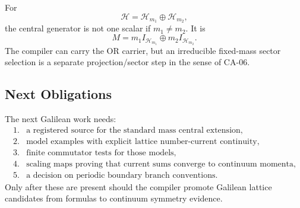 For
\[
  \mathcal H=\mathcal H_{m_1}\oplus\mathcal H_{m_2},
\]
the central generator is not one scalar if \(m_1\ne m_2\).  It is
\[
  M=m_1I_{\mathcal H_{m_1}}\oplus m_2I_{\mathcal H_{m_2}}.
\]
The compiler can carry the OR carrier, but an irreducible fixed-mass sector
selection is a separate projection/sector step in the sense of CA-06.

\subsection{Next Obligations}

The next Galilean work needs:
\[
\begin{array}{ll}
1.&\text{a registered source for the standard mass central extension},\\
2.&\text{model examples with explicit lattice number-current continuity},\\
3.&\text{finite commutator tests for those models},\\
4.&\text{scaling maps proving that current sums converge to continuum momenta},\\
5.&\text{a decision on periodic boundary branch conventions.}
\end{array}
\]
Only after these are present should the compiler promote Galilean lattice
candidates from formulas to continuum symmetry evidence.
